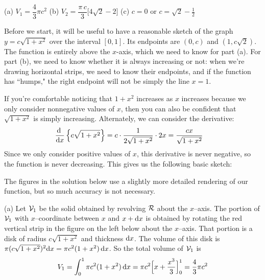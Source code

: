 \begin{answer} (a)
$V_1=\dfrac{4}{3}\pi c^2$
\qquad(b)
$V_2 =\dfrac{\pi\,c}{3}\big[4\sqrt{2}-2 \big] $
\qquad (c)
$c=0\text{ or }c=\sqrt{2}-\frac{1}{2}$
\end{answer}

\begin{solution}
Before we start, it will be useful to have a reasonable sketch of the graph $y=c\sqrt{1+x^2}$ over the interval $[0,1]$. Its endpoints are $(0,c)$ and $(1,c\sqrt{2})$. The function is entirely above the $x$-axis, which we need to know for part (a). For part (b), we need to know whether it is always increasing or not: when we're drawing horizontal strips, we need to know their endpoints, and if the function has ``humps," the right endpoint will not be simply the line $x=1$.

If you're comfortable noticing that $1+x^2$ increases as $x$ increases because we only consider nonnegative values of $x$, then you can also be confident that $\sqrt{1+x^2}$ is simply increasing. Alternately, we can consider the derivative:
\begin{align*}
\diff{}{x}\left\{c\sqrt{1+x^2}\right\}&=c\cdot \dfrac{1}{2\sqrt{1+x^2}}\cdot 2x = \dfrac{cx}{\sqrt{1+x^2}}
\end{align*}
Since we only consider positive values of $x$, this derivative is never negative, so the function is never decreasing. This gives us the following basic sketch:
\begin{center}
\end{center}

The figures in the solution below use a slightly more detailed rendering of our function, but so much accuracy is not necessary.

(a)
Let $\mathcal{V}_1$ be the solid obtained by revolving
$\mathcal{R}$ about the $x$--axis. The portion of $\mathcal{V}_1$ with $x$--coordinate
between $x$ and $x+\mathrm{d}x$ is obtained by rotating the red vertical strip in
the figure on the left below about the $x$--axis.
That portion is a disk of radius $c\sqrt{1+x^2}$ and thickness
$\mathrm{d}x$. The volume of this disk is $\pi(c\sqrt{1+x^2})^2\mathrm{d}x=\pi c^2 (1+x^2)\,\mathrm{d}x$.
So the total volume of $\mathcal{V}_1$ is
\begin{align*}
V_1=\int_0^1 \pi c^2 (1+x^2)\,\mathrm{d}x
=\pi c^2\Big[x+\frac{x^3}{3}\Big]_0^1
=\frac{4}{3}\pi c^2
\end{align*}


\end{solution}
